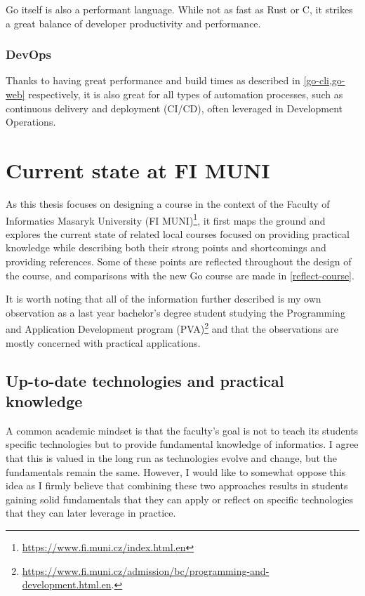 \documentclass[
  digital,
  color,
  oneside,
  nosansbold,
  nocolorbold,
  nolof,
  nolot,
]{fithesis4}
\begin{document}
Go itself is also a performant language. While not as fast as Rust\cite{rust} or C\cite{c}, it strikes a great balance of developer productivity and performance. \cite{benchmarks-game,go-web}

\subsection{DevOps}

Thanks to having great performance and build times as described in \cref{go-cli,go-web} respectively, it is also great for all types of automation processes, such as continuous delivery and deployment (CI/CD), often leveraged in Development Operations. \cite{go-devops}

\chapter{Current state at FI MUNI}\label{chapter-state}

As this thesis focuses on designing a course in the context of the Faculty of Informatics Masaryk University (FI MUNI)\footnote{\url{https://www.fi.muni.cz/index.html.en}}, it first maps the ground and explores the current state of related local courses focused on providing practical knowledge while describing both their strong points and shortcomings and providing references. Some of these points are reflected throughout the design of the course, and comparisons with the new Go course are made in \cref{reflect-course}.

It is worth noting that all of the information further described is my own observation as a last year bachelor's degree student studying the Programming and Application Development program (PVA)\footnote{\url{https://www.fi.muni.cz/admission/bc/programming-and-development.html.en}.} and that the observations are mostly concerned with practical applications.

\section{Up-to-date technologies and practical knowledge}

A common academic mindset is that the faculty's goal is not to teach its students specific technologies but to provide fundamental knowledge of informatics. I agree that this is valued in the long run as technologies evolve and change, but the fundamentals remain the same. However, I would like to somewhat oppose this idea as I firmly believe that combining these two approaches results in students gaining solid fundamentals that they can apply or reflect on specific technologies that they can later leverage in practice.
\end{document}
